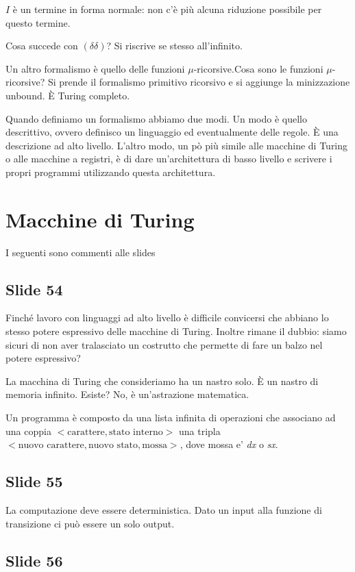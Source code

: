 $I$ è un termine in forma normale: non c'è più alcuna riduzione possibile per questo termine.

Cosa succede con $(\delta \delta)$? Si riscrive se stesso all'infinito.

Un altro formalismo è quello delle funzioni $\mu$-ricorsive.Cosa sono le funzioni $\mu$-ricorsive?
Si prende il formalismo primitivo ricorsivo e si aggiunge la minizzazione unbound. È Turing
completo.

Quando definiamo un formalismo abbiamo due modi. Un modo è quello descrittivo, ovvero definisco un
linguaggio ed eventualmente delle regole. È una descrizione ad alto livello. L'altro modo, un pò
più simile alle macchine di Turing o alle macchine a registri, è di dare un'architettura di basso
livello e scrivere i propri programmi utilizzando questa architettura.

\section{Macchine di Turing}

I seguenti sono commenti alle slides

\subsection{Slide 54}

Finché lavoro con linguaggi ad alto livello è difficile convicersi che abbiano lo stesso potere
espressivo delle macchine di Turing. Inoltre rimane il dubbio: siamo sicuri di non aver tralasciato
un costrutto che permette di fare un balzo nel potere espressivo?

La macchina di Turing che consideriamo ha un nastro solo. È un nastro di memoria infinito. Esiste?
No, è un'astrazione matematica.

Un programma è composto da una lista infinita di operazioni che associano ad una coppia
$<\text{carattere},\text{stato interno}>$ una tripla $<\text{nuovo carattere}, \text{nuovo stato},
\text{mossa}>$, dove mossa e' \textit{dx} o \textit{sx}.

\subsection{Slide 55}

La computazione deve essere deterministica. Dato un input alla funzione di transizione ci può
essere un solo output.

\subsection{Slide 56}

